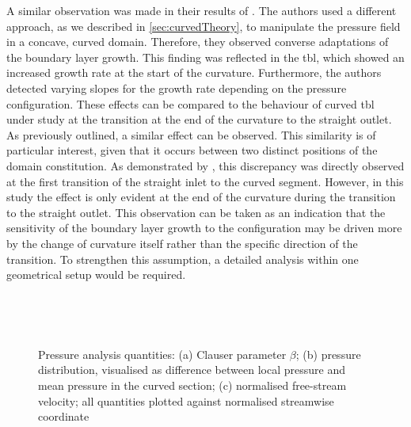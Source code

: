 A similar observation was made in their results of \citet{appelbaum_systematic_2025}.
The authors used a different approach, as we described in \autoref{sec:curvedTheory}, to manipulate the pressure field in a concave, curved domain.
Therefore, they observed converse adaptations of the boundary layer growth. This finding was reflected in the \acrshort{tbl}, which showed an increased growth rate at the start of the curvature. 
Furthermore, the authors detected varying slopes for the growth rate depending on the pressure configuration.
These effects can be compared to the behaviour of  curved \acrshort{tbl} under study at the transition at the end of the curvature to the straight outlet.
As  previously outlined, a similar effect can be observed.
This similarity is of particular interest, given that it occurs between two distinct positions of the domain constitution.
As demonstrated by \citet{appelbaum_systematic_2025},  this discrepancy was directly observed  at the first transition of the straight inlet to the curved segment. However, in this study the effect is  only evident at the end of the curvature during the transition to the straight outlet.
This observation can be taken as an indication that the sensitivity of the boundary layer growth to the configuration may be driven more by the change of curvature itself rather than the specific direction of the transition. 
To strengthen this assumption, a detailed analysis within one geometrical setup would be required.

\begin{figure}[h!]
\centering\begin{subfigure}[t]{0.495\textwidth}
    \centering
    \subcaption{}
    
    \label{fig:R100deg30Re1200Beta}
\end{subfigure}
\hfill
\begin{subfigure}[t]{0.495\textwidth}
    \subcaption{}
    \centering
    
    \label{fig:R100deg30Re1200p}
\end{subfigure}
\\[-20pt]
\begin{subfigure}[t]{0.495\textwidth}
    \centering
    \subcaption{}
    
    \label{fig:R100deg30Re1200Uinf}
\end{subfigure}
\\[-15pt]
\caption{Pressure analysis quantities: (a) Clauser parameter $\beta$; (b) pressure distribution, visualised as difference between local pressure and mean pressure in the curved section; (c) normalised free-stream velocity; all quantities plotted against normalised streamwise coordinate}
\label{fig:R100deg30Re1200Prelated}
\end{figure}

